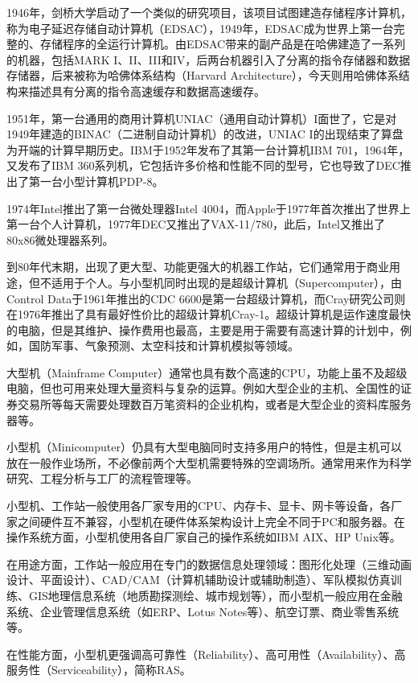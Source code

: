 1946年，剑桥大学启动了一个类似的研究项目，该项目试图建造存储程序计算机，称为电子延迟存储自动计算机（EDSAC），1949年，EDSAC成为世界上第一台完整的、存储程序的全运行计算机。由EDSAC带来的副产品是在哈佛建造了一系列的机器，包括MARK I、II、III和IV，后两台机器引入了分离的指令存储器和数据存储器，后来被称为哈佛体系结构（Harvard Architecture），今天则用哈佛体系结构来描述具有分离的指令高速缓存和数据高速缓存。

1951年，第一台通用的商用计算机UNIAC（通用自动计算机）I面世了，它是对1949年建造的BINAC（二进制自动计算机）的改进，UNIAC I的出现结束了算盘为开端的计算早期历史。IBM于1952年发布了其第一台计算机IBM 701，1964年，又发布了IBM 360系列机，它包括许多价格和性能不同的型号，它也导致了DEC推出了第一台小型计算机PDP-8。

1974年Intel推出了第一台微处理器Intel 4004，而Apple于1977年首次推出了世界上第一台个人计算机，1977年DEC又推出了VAX-11/780，此后，Intel又推出了80x86微处理器系列。

到80年代末期，出现了更大型、功能更强大的机器工作站，它们通常用于商业用途，但不适用于个人。与小型机同时出现的是超级计算机（Supercomputer），由Control Data于1961年推出的CDC 6600是第一台超级计算机，而Cray研究公司则在1976年推出了具有最好性价比的超级计算机Cray-1。超级计算机是运作速度最快的电脑，但是其维护、操作费用也最高，主要是用于需要有高速计算的计划中，例如，国防军事、气象预测、太空科技和计算机模拟等领域。

大型机（Mainframe Computer）通常也具有数个高速的CPU，功能上虽不及超级电脑，但也可用来处理大量资料与复杂的运算。例如大型企业的主机、全国性的证券交易所等每天需要处理数百万笔资料的企业机构，或者是大型企业的资料库服务器等。

小型机（Minicomputer）仍具有大型电脑同时支持多用户的特性，但是主机可以放在一般作业场所，不必像前两个大型机需要特殊的空调场所。通常用来作为科学研究、工程分析与工厂的流程管理等。

小型机、工作站一般使用各厂家专用的CPU、内存卡、显卡、网卡等设备，各厂家之间硬件互不兼容，小型机在硬件体系架构设计上完全不同于PC和服务器。在操作系统方面，小型机使用各自厂家自己的操作系统如IBM AIX、HP Unix等。

在用途方面，工作站一般应用在专门的数据信息处理领域：图形化处理（三维动画设计、平面设计）、CAD/CAM（计算机辅助设计或辅助制造）、军队模拟仿真训练、GIS地理信息系统（地质勘探测绘、城市规划等），而小型机一般应用在金融系统、企业管理信息系统（如ERP、Lotus Notes等）、航空订票、商业零售系统等。

在性能方面，小型机更强调高可靠性（Reliability）、高可用性（Availability）、高服务性（Serviceability），简称RAS。

